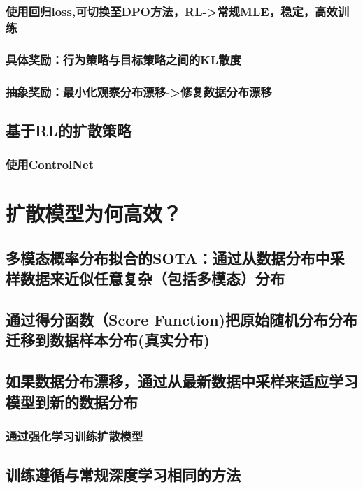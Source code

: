 \documentclass[11pt]{article}
\begin{document}
\subsubsection*{使用回归loss,可切换至DPO方法，RL->常规MLE，稳定，高效训练}
\label{sec:org609c0cc}
\subsubsection*{具体奖励：行为策略与目标策略之间的KL散度}
\label{sec:org6215884}
\subsubsection*{抽象奖励：最小化观察分布漂移->修复数据分布漂移}
\label{sec:orgf720cd3}
\subsection*{基于RL的扩散策略}
\label{sec:orgeb02d7d}
\subsubsection*{使用ControlNet}
\label{sec:org2bedaf9}
\section*{扩散模型为何高效？}
\label{sec:org70295d5}
\subsection*{多模态概率分布拟合的SOTA：通过从数据分布中采样数据来近似任意复杂（包括多模态）分布}
\label{sec:orge5a7566}
\subsection*{通过得分函数（Score Function)把原始随机分布分布迁移到数据样本分布(真实分布)}
\label{sec:org314ff9e}
\subsection*{如果数据分布漂移，通过从最新数据中采样来适应学习模型到新的数据分布}
\label{sec:org3e5db83}
\subsubsection*{通过强化学习训练扩散模型}
\label{sec:org506432e}
\subsection*{训练遵循与常规深度学习相同的方法}
\label{sec:orgf517f6a}
\end{document}
